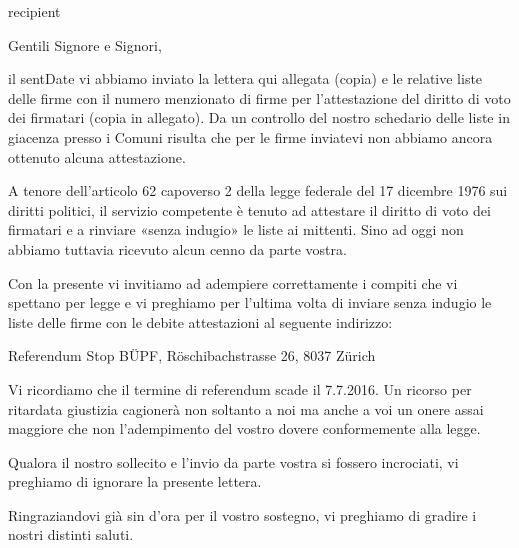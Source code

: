 \documentclass[a4paper,10pt,parskip=half,italian]{scrlttr2}
\begin{document}
\begin{letter}{{{ recipient }}}





\opening{Gentili Signore e Signori,}

il {{ sentDate }} vi abbiamo inviato la lettera qui allegata (copia) e le relative liste delle firme con il numero menzionato di firme per l’attestazione del diritto di voto dei firmatari (copia in allegato). Da un controllo del nostro schedario delle liste in giacenza presso i Comuni risulta che per le firme inviatevi non abbiamo ancora ottenuto alcuna attestazione.

A tenore dell’articolo 62 capoverso 2 della legge federale del 17 dicembre 1976 sui diritti politici, il servizio competente è tenuto ad attestare il diritto di voto dei firmatari e a rinviare «senza indugio» le liste ai mittenti. Sino ad oggi non abbiamo tuttavia ricevuto alcun cenno da parte vostra.

Con la presente vi invitiamo ad adempiere correttamente i compiti che vi spettano per legge e vi preghiamo per l’ultima volta di inviare senza indugio le liste delle firme con le debite attestazioni al seguente indirizzo: 

\leftskip=3mm
Referendum Stop BÜPF, Röschibachstrasse 26, 8037 Zürich

\leftskip=0mm
Vi ricordiamo che il termine di referendum scade il 7.7.2016. Un ricorso per ritardata giustizia cagionerà non soltanto a noi ma anche a voi un onere assai maggiore che non l’adempimento del vostro dovere conformemente alla legge. 
 
Qualora il nostro sollecito e l’invio da parte vostra si fossero incrociati, vi preghiamo di ignorare la presente lettera.

\closing{Ringraziandovi già sin d’ora per il vostro sostegno, vi preghiamo di gradire i nostri distinti saluti.}

\end{letter}
\end{document}
